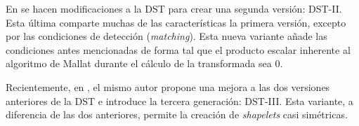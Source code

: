 En \cite{Guido2018} se hacen modificaciones a la DST para crear una segunda versión: DST-II. Esta última
comparte muchas de las características la primera versión, excepto por las condiciones 
de detección (\textit{matching}).
Esta nueva variante añade las condiciones antes mencionadas de forma tal que el producto escalar inherente al algoritmo
de Mallat durante el cálculo de la transformada sea $0$.

Recientemente, en \cite{Guido2021}, el mismo autor propone una mejora a las dos versiones anteriores de la 
DST e introduce la tercera generación: DST-III. Esta variante, a diferencia de las dos anteriores, permite 
la creación de \textit{ shapelets} casi simétricas. 



